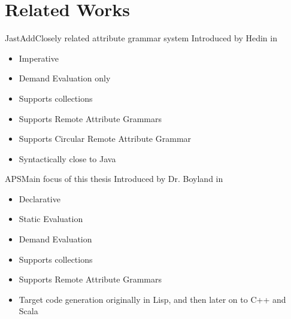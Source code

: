 \section{Related Works}

\begin{frame}{JastAdd}{Closely related attribute grammar system}
Introduced by Hedin in \cite{DBLP:journals/entcs/HedinM01}
		
\begin{itemize}
    \item \alert{Imperative}
    \item \alert{Demand Evaluation only}
    \item Supports collections
    \item Supports Remote Attribute Grammars
    \item \alert{Supports Circular Remote Attribute Grammar}
    \item Syntactically close to Java
\end{itemize}

\end{frame}


\begin{frame}{APS}{Main focus of this thesis}
Introduced by Dr. Boyland in \cite{10.5555/924544}
		
\begin{itemize}
    \item \alert{Declarative}
    \item \alert{Static Evaluation}
    \item Demand Evaluation
    \item Supports collections
    \item Supports Remote Attribute Grammars
    \item Target code generation originally in Lisp, and then later on to C++ and Scala
\end{itemize}

\end{frame}


